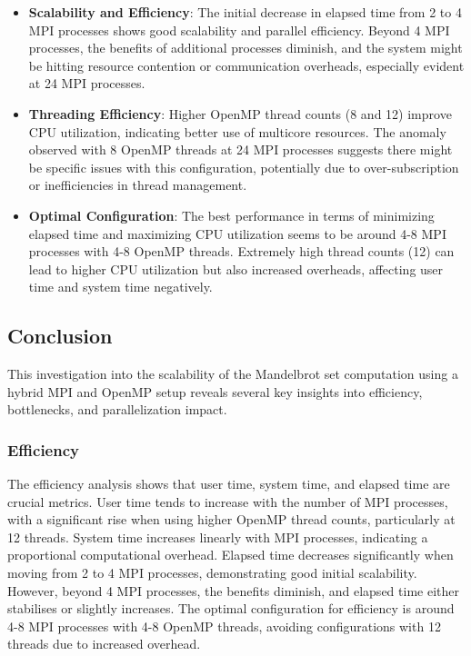 \documentclass[
]{article}
\begin{document}
\begin{itemize}
\item
  \textbf{Scalability and Efficiency}: The initial decrease in elapsed
  time from 2 to 4 MPI processes shows good scalability and parallel
  efficiency. Beyond 4 MPI processes, the benefits of additional
  processes diminish, and the system might be hitting resource
  contention or communication overheads, especially evident at 24 MPI
  processes.
\item
  \textbf{Threading Efficiency}: Higher OpenMP thread counts (8 and 12)
  improve CPU utilization, indicating better use of multicore resources.
  The anomaly observed with 8 OpenMP threads at 24 MPI processes
  suggests there might be specific issues with this configuration,
  potentially due to over-subscription or inefficiencies in thread
  management.
\item
  \textbf{Optimal Configuration}: The best performance in terms of
  minimizing elapsed time and maximizing CPU utilization seems to be
  around 4-8 MPI processes with 4-8 OpenMP threads. Extremely high
  thread counts (12) can lead to higher CPU utilization but also
  increased overheads, affecting user time and system time negatively.
\end{itemize}

\subsection{Conclusion}\label{conclusion}

This investigation into the scalability of the Mandelbrot set
computation using a hybrid MPI and OpenMP setup reveals several key
insights into efficiency, bottlenecks, and parallelization impact.

\subsubsection{Efficiency}\label{efficiency-3}

The efficiency analysis shows that user time, system time, and elapsed
time are crucial metrics. User time tends to increase with the number of
MPI processes, with a significant rise when using higher OpenMP thread
counts, particularly at 12 threads. System time increases linearly with
MPI processes, indicating a proportional computational overhead. Elapsed
time decreases significantly when moving from 2 to 4 MPI processes,
demonstrating good initial scalability. However, beyond 4 MPI processes,
the benefits diminish, and elapsed time either stabilises or slightly
increases. The optimal configuration for efficiency is around 4-8 MPI
processes with 4-8 OpenMP threads, avoiding configurations with 12
threads due to increased overhead.
\end{document}

